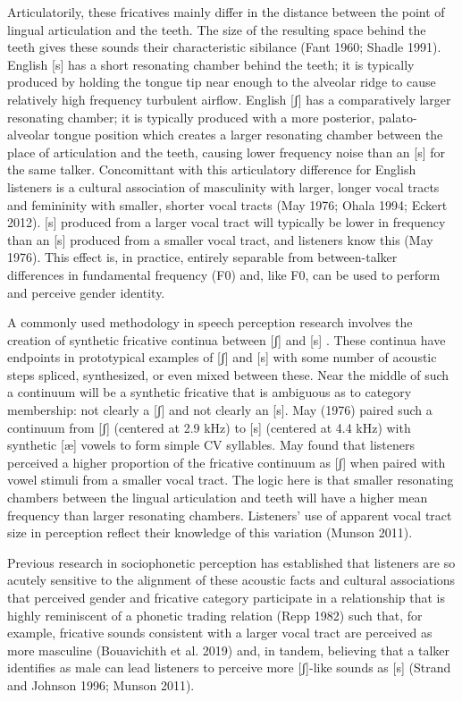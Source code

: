 \documentclass[
  letterpaper,
  DIV=11,
  numbers=noendperiod]{scrartcl}
\begin{document}
Articulatorily, these fricatives mainly differ in the distance between
the point of lingual articulation and the teeth. The size of the
resulting space behind the teeth gives these sounds their characteristic
sibilance (Fant 1960; Shadle 1991). English {[}s{]} has a short
resonating chamber behind the teeth; it is typically produced by holding
the tongue tip near enough to the alveolar ridge to cause relatively
high frequency turbulent airflow. English {[}ʃ{]} has a comparatively
larger resonating chamber; it is typically produced with a more
posterior, palato-alveolar tongue position which creates a larger
resonating chamber between the place of articulation and the teeth,
causing lower frequency noise than an {[}s{]} for the same talker.
Concomittant with this articulatory difference for English listeners is
a cultural association of masculinity with larger, longer vocal tracts
and femininity with smaller, shorter vocal tracts (May 1976; Ohala 1994;
Eckert 2012). {[}s{]} produced from a larger vocal tract will typically
be lower in frequency than an {[}s{]} produced from a smaller vocal
tract, and listeners know this (May 1976). This effect is, in practice,
entirely separable from between-talker differences in fundamental
frequency (F0) and, like F0, can be used to perform and perceive gender
identity.

A commonly used methodology in speech perception research involves the
creation of synthetic fricative continua between {[}ʃ{]} and {[}s{]} .
These continua have endpoints in prototypical examples of {[}ʃ{]} and
{[}s{]} with some number of acoustic steps spliced, synthesized, or even
mixed between these. Near the middle of such a continuum will be a
synthetic fricative that is ambiguous as to category membership: not
clearly a {[}ʃ{]} and not clearly an {[}s{]}. May (1976) paired such a
continuum from {[}ʃ{]} (centered at 2.9 kHz) to {[}s{]} (centered at 4.4
kHz) with synthetic {[}æ{]} vowels to form simple CV syllables. May
found that listeners perceived a higher proportion of the fricative
continuum as {[}ʃ{]} when paired with vowel stimuli from a smaller vocal
tract. The logic here is that smaller resonating chambers between the
lingual articulation and teeth will have a higher mean frequency than
larger resonating chambers. Listeners' use of apparent vocal tract size
in perception reflect their knowledge of this variation (Munson 2011).

Previous research in sociophonetic perception has established that
listeners are so acutely sensitive to the alignment of these acoustic
facts and cultural associations that perceived gender and fricative
category participate in a relationship that is highly reminiscent of a
phonetic trading relation (Repp 1982) such that, for example, fricative
sounds consistent with a larger vocal tract are perceived as more
masculine (Bouavichith et al. 2019) and, in tandem, believing that a
talker identifies as male can lead listeners to perceive more
{[}ʃ{]}-like sounds as {[}s{]} (Strand and Johnson 1996; Munson 2011).
\end{document}
